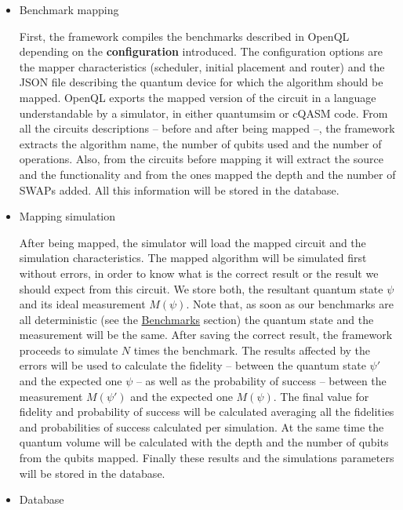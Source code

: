 \begin{itemize}
\item Benchmark mapping
\label{sec:org503e156}

First, the framework compiles the benchmarks described in OpenQL depending on the \textbf{configuration} introduced.
The configuration options are the mapper characteristics (scheduler, initial placement and router) and the JSON file describing the quantum device for which the algorithm should be mapped.
OpenQL exports the mapped version of the circuit in a language understandable by a simulator, in either quantumsim or cQASM \cite{khammassi18} code.
From all the circuits descriptions -- before and after being mapped --, the framework extracts the algorithm name, the number of qubits used and the number of operations.
Also, from the circuits before mapping it will extract the source and the functionality and from the ones mapped the depth and the number of SWAPs added.
All this information will be stored in the database.

\item Mapping simulation
\label{sec:org34d6e85}

After being mapped, the simulator will load the mapped circuit and the simulation characteristics.
The mapped algorithm will be simulated first without errors, in order to know what is the correct result or the result we should expect from this circuit.
We store both, the resultant quantum state \(\psi\) and its ideal measurement \(M(\psi)\).
Note that, as soon as our benchmarks are all deterministic (see the \hyperref[sec:org7aebf47]{Benchmarks} section) the quantum state and the measurement will be the same.
After saving the correct result, the framework proceeds to simulate \(N\) times the benchmark.
The results affected by the errors will be used to calculate the fidelity -- between the quantum state \(\psi'\) and the expected one \(\psi\) -- as well as the probability of success -- between the measurement \(M(\psi')\) and the expected one \(M(\psi)\).
The final value for fidelity and probability of success will be calculated averaging all the fidelities and probabilities of success calculated per simulation.
At the same time the quantum volume will be calculated with the depth and the number of qubits from the qubits mapped.
Finally these results and the simulations parameters will be stored in the database.

\item Database
\label{sec:org0c95875}


\end{itemize}
